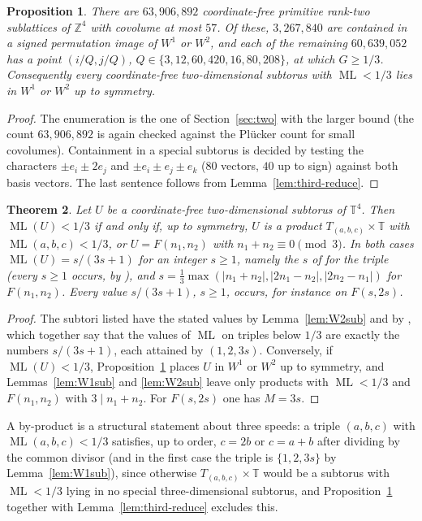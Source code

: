 \documentclass[12pt]{amsart}
\newtheorem{theorem}{Theorem}[section]
\newtheorem{proposition}[theorem]{Proposition}
\theoremstyle{definition}\newtheorem{definition}[theorem]{Definition}
\theoremstyle{remark}\newtheorem{remark}[theorem]{Remark}
\newcommand{\Z}{\mathbb Z}\newcommand{\R}{\mathbb R}\newcommand{\T}{\mathbb T}
\newcommand{\ML}{\operatorname{ML}}
\newcommand{\Wone}{W^{1}}\newcommand{\Wtwo}{W^{2}}
\begin{document}
\begin{proposition}\label{prop:third-enum}
There are $63{,}906{,}892$ coordinate-free primitive rank-two sublattices of $\Z^4$ with covolume at most $57$. Of these, $3{,}267{,}840$ are contained in a signed permutation image of $\Wone$ or $\Wtwo$, and each of the remaining $60{,}639{,}052$ has a point $(i/Q,j/Q)$, $Q\in\{3,12,60,420,16,80,208\}$, at which $G\ge1/3$. Consequently every coordinate-free two-dimensional subtorus with $\ML<1/3$ lies in $\Wone$ or $\Wtwo$ up to symmetry.
\end{proposition}
\begin{proof}
The enumeration is the one of Section~\ref{sec:two} with the larger bound (the count $63{,}906{,}892$ is again checked against the Pl\"ucker count for small covolumes). Containment in a special subtorus is decided by testing the characters $\pm e_i\pm2e_j$ and $\pm e_i\pm e_j\pm e_k$ ($80$ vectors, $40$ up to sign) against both basis vectors. The last sentence follows from Lemma~\ref{lem:third-reduce}.
\end{proof}

\begin{theorem}\label{thm:second}
Let $U$ be a coordinate-free two-dimensional subtorus of $\T^4$. Then $\ML(U)<1/3$ if and only if, up to symmetry, $U$ is a product $T_{(a,b,c)}\times\T$ with $\ML(a,b,c)<1/3$, or $U=F(n_1,n_2)$ with $n_1+n_2\equiv0\pmod3$. In both cases $\ML(U)=s/(3s+1)$ for an integer $s\ge1$, namely the $s$ of \cite[Theorem~7.2]{Kravitz} for the triple (every $s\ge1$ occurs, by \cite[Theorem~5.1]{Kravitz}), and $s=\frac13\max(|n_1+n_2|,|2n_1-n_2|,|2n_2-n_1|)$ for $F(n_1,n_2)$. Every value $s/(3s+1)$, $s\ge1$, occurs, for instance on $F(s,2s)$.
\end{theorem}
\begin{proof}
The subtori listed have the stated values by Lemma~\ref{lem:W2sub} and by \cite[Theorems~5.1 and 7.2]{Kravitz}, which together say that the values of $\ML$ on triples below $1/3$ are exactly the numbers $s/(3s+1)$, each attained by $(1,2,3s)$. Conversely, if $\ML(U)<1/3$, Proposition~\ref{prop:third-enum} places $U$ in $\Wone$ or $\Wtwo$ up to symmetry, and Lemmas~\ref{lem:W1sub} and \ref{lem:W2sub} leave only products with $\ML<1/3$ and $F(n_1,n_2)$ with $3\mid n_1+n_2$. For $F(s,2s)$ one has $M=3s$.
\end{proof}

A by-product is a structural statement about three speeds: a triple $(a,b,c)$ with $\ML(a,b,c)<1/3$ satisfies, up to order, $c=2b$ or $c=a+b$ after dividing by the common divisor (and in the first case the triple is $\{1,2,3s\}$ by Lemma~\ref{lem:W1sub}), since otherwise $T_{(a,b,c)}\times\T$ would be a subtorus with $\ML<1/3$ lying in no special three-dimensional subtorus, and Proposition~\ref{prop:third-enum} together with Lemma~\ref{lem:third-reduce} excludes this.
\end{document}
